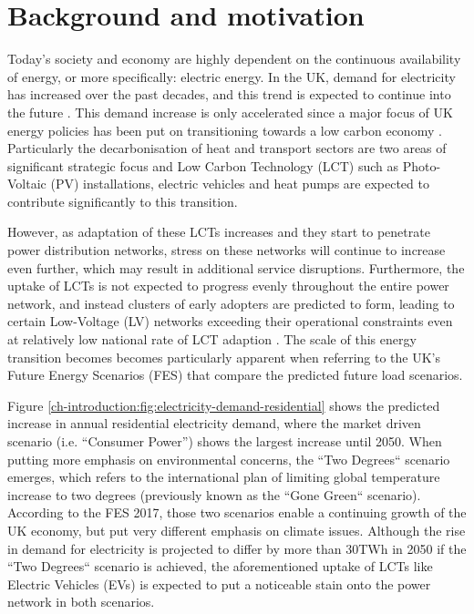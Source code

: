 \section{Background and motivation}
\label{ch-introduction:sec:background}

Today's society and economy are highly dependent on the continuous availability of energy, or more specifically: electric energy.
In the UK, demand for electricity has increased over the past decades, and this trend is expected to continue into the future \cite{HMGovernment2009}.
This demand increase is only accelerated since a major focus of UK energy policies has been put on transitioning towards a low carbon economy \cite{RoyalAcademyofEngineering2010}.
Particularly the decarbonisation of heat and transport sectors are two areas of significant strategic focus and Low Carbon Technology (LCT) such as Photo-Voltaic (PV) installations, electric vehicles and heat pumps are expected to contribute significantly to this transition.


However, as adaptation of these LCTs increases and they start to penetrate power distribution networks, stress on these networks will continue to increase even further, which may result in additional service disruptions.
Furthermore, the uptake of LCTs is not expected to progress evenly throughout the entire power network, and instead clusters of early adopters are predicted to form, leading to certain Low-Voltage (LV) networks exceeding their operational constraints even at relatively low national rate of LCT adaption \cite{Poghosyan2014}.
The scale of this energy transition becomes becomes particularly apparent when referring to the UK's Future Energy Scenarios (FES) that compare the predicted future load scenarios.



Figure \ref{ch-introduction:fig:electricity-demand-residential} shows the predicted increase in annual residential electricity demand, where the market driven scenario (i.e. ``Consumer Power'') shows the largest increase until 2050.
When putting more emphasis on environmental concerns, the ``Two Degrees`` scenario emerges, which refers to the international plan of limiting global temperature increase to two degrees (previously known as the ``Gone Green`` scenario).
According to the FES 2017, those two scenarios enable a continuing growth of the UK economy, but put very different emphasis on climate issues.
Although the rise in demand for electricity is projected to differ by more than 30TWh in 2050 if the ``Two Degrees`` scenario is achieved, the aforementioned uptake of LCTs like Electric Vehicles (EVs) is expected to put a noticeable stain onto the power network in both scenarios.

